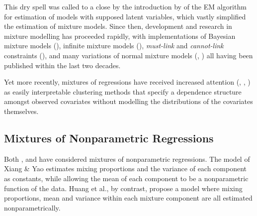 \documentclass[10pt]{olplainarticle}\usepackage[]{graphicx}\usepackage[]{color}
\begin{document}
This dry spell was called to a close by the introduction by \cite{dempster} of the EM algorithm for estimation of models with supposed latent variables, which vastly simplified the estimation of mixture models. Since then, development and research in mixture modelling has proceeded rapidly, with implementations of Bayesian mixture models (\cite{marin}), infinite mixture models (\cite{infinite}), \emph{must-link} and \emph{cannot-link} constraints (\cite{wagstaff}), and many variations of normal mixture models (\cite{mclachlannormal}, \cite{fraley}) all having been published within the last two decades.

Yet more recently, mixtures of regressions have received increased attention (\cite{mixglm}, \cite{viele}, \cite{hurn}) as easily interpretable clustering methods that specify a dependence structure amongst observed covariates without modelling the distributions of the covariates themselves. 







\subsection{Mixtures of Nonparametric Regressions}

Both \cite{xiang}, and \cite{huang} have considered mixtures of nonparametric regressions. The model of Xiang \& Yao estimates mixing proportions and the variance of each component as constants, while allowing the mean of each component to be a nonparametric function of the data. Huang et al., by contrast, propose a model where mixing proportions, mean and variance within each mixture component are all estimated nonparametrically.
\end{document}
